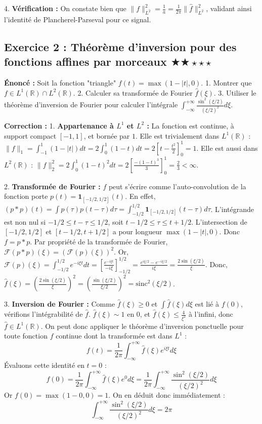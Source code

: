 \documentclass[11pt,a4paper]{article}
\begin{document}
4. \textbf{Vérification :}
On constate bien que $\|f\|_{L^2}^2 = \frac{1}{a} = \frac{1}{2\pi} \|\hat{f}\|_{L^2}^2$, validant ainsi l'identité de Plancherel-Parseval pour ce signal.



\subsection*{Exercice 2 : Théorème d'inversion pour des fonctions affines par morceaux \quad $\bigstar\bigstar\star\star\star$}

\textbf{Énoncé :}
Soit la fonction "triangle" $f(t) = \max(1 - |t|, 0)$.
1. Montrer que $f \in L^1(\mathbb{R}) \cap L^2(\mathbb{R})$.
2. Calculer sa transformée de Fourier $\hat{f}(\xi)$.
3. Utiliser le théorème d'inversion de Fourier pour calculer l'intégrale $\int_{-\infty}^{+\infty} \frac{\sin^2(\xi/2)}{(\xi/2)^2} d\xi$.

\textbf{Correction :}
1. \textbf{Appartenance à $L^1$ et $L^2$ :}
La fonction est continue, à support compact $[-1, 1]$, et bornée par $1$.
Elle est trivialement dans $L^1(\mathbb{R})$ : $\|f\|_1 = \int_{-1}^1 (1-|t|) dt = 2 \int_0^1 (1-t) dt = 2 \left[ t - \frac{t^2}{2} \right]_0^1 = 1$.
Elle est aussi dans $L^2(\mathbb{R})$ : $\|f\|_2^2 = 2 \int_0^1 (1-t)^2 dt = 2 \left[ \frac{-(1-t)^3}{3} \right]_0^1 = \frac{2}{3} < \infty$.

2. \textbf{Transformée de Fourier :}
$f$ peut s'écrire comme l'auto-convolution de la fonction porte $p(t) = \mathbf{1}_{[-1/2, 1/2]}(t)$.
En effet, $(p * p)(t) = \int p(\tau) p(t-\tau) d\tau = \int_{-1/2}^{1/2} \mathbf{1}_{[-1/2, 1/2]}(t-\tau) d\tau$.
L'intégrande est non nul si $-1/2 \leq t-\tau \leq 1/2$, soit $t-1/2 \leq \tau \leq t+1/2$.
L'intersection de $[-1/2, 1/2]$ et $[t-1/2, t+1/2]$ a pour longueur $\max(1-|t|, 0)$. Donc $f = p * p$.
Par propriété de la transformée de Fourier, $\mathcal{F}(p * p)(\xi) = (\mathcal{F}(p)(\xi))^2$.
Or, $\mathcal{F}(p)(\xi) = \int_{-1/2}^{1/2} e^{-i\xi t} dt = \left[ \frac{e^{-i\xi t}}{-i\xi} \right]_{-1/2}^{1/2} = \frac{e^{i\xi/2} - e^{-i\xi/2}}{i\xi} = \frac{2\sin(\xi/2)}{\xi}$.
Donc, $\hat{f}(\xi) = \left( \frac{2\sin(\xi/2)}{\xi} \right)^2 = \left( \frac{\sin(\xi/2)}{\xi/2} \right)^2 = \text{sinc}^2(\xi/2)$.

3. \textbf{Inversion de Fourier :}
Comme $\hat{f}(\xi) \ge 0$ et $\int \hat{f}(\xi) d\xi$ est lié à $f(0)$, vérifions l'intégrabilité de $\hat{f}$.
$\hat{f}(\xi) \sim 1$ en $0$, et $\hat{f}(\xi) \le \frac{4}{\xi^2}$ à l'infini, donc $\hat{f} \in L^1(\mathbb{R})$.
On peut donc appliquer le théorème d'inversion ponctuelle pour toute fonction $f$ continue dont la transformée est dans $L^1$ :
$$ f(t) = \frac{1}{2\pi} \int_{-\infty}^{+\infty} \hat{f}(\xi) e^{i\xi t} d\xi $$
Évaluons cette identité en $t=0$ :
$$ f(0) = \frac{1}{2\pi} \int_{-\infty}^{+\infty} \hat{f}(\xi) e^0 d\xi = \frac{1}{2\pi} \int_{-\infty}^{+\infty} \frac{\sin^2(\xi/2)}{(\xi/2)^2} d\xi $$
Or $f(0) = \max(1-0, 0) = 1$.
On en déduit donc immédiatement :
$$ \int_{-\infty}^{+\infty} \frac{\sin^2(\xi/2)}{(\xi/2)^2} d\xi = 2\pi $$
\end{document}
